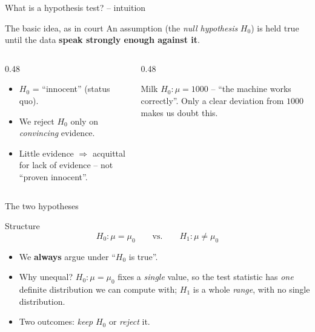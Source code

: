 \documentclass[aspectratio=169,11pt]{beamer}
\begin{document}
\begin{frame}{What is a hypothesis test? -- intuition}
  \begin{block}{The basic idea, as in court}
    An assumption (the \emph{null hypothesis} $H_0$) is held true until the
    data \textbf{speak strongly enough against it}.
  \end{block}
  \begin{columns}[T]
    \begin{column}{0.48\textwidth}
      \begin{itemize}\setlength{\itemsep}{3pt}
        \item \textbf{$H_0$} = ``innocent'' (status quo).
        \item We reject $H_0$ only on \emph{convincing} evidence.
        \item Little evidence $\Rightarrow$ acquittal for lack of evidence
              -- not ``proven innocent''.
      \end{itemize}
    \end{column}
    \begin{column}{0.48\textwidth}
      \begin{exampleblock}{Milk}
        $H_0:\mu = 1000$ -- ``the machine works correctly''.
        Only a clear deviation from $1000$ makes us doubt this.
      \end{exampleblock}
    \end{column}
  \end{columns}
\end{frame}

\begin{frame}{The two hypotheses}
  \begin{block}{Structure}
    \[
      H_0:\mu = \mu_0 \qquad\text{vs.}\qquad H_1:\mu \neq \mu_0
    \]
  \end{block}
  \begin{itemize}\setlength{\itemsep}{3pt}
    \item We \textbf{always} argue under ``$H_0$ is true''.
    \item Why unequal? $H_0:\mu=\mu_0$ fixes a \emph{single} value, so the test
          statistic has \emph{one} definite distribution we can compute with;
          $H_1$ is a whole \emph{range}, with no single distribution.
    \item Two outcomes: \emph{keep} $H_0$ or \emph{reject} it.
  \end{itemize}
\end{frame}
\end{document}
